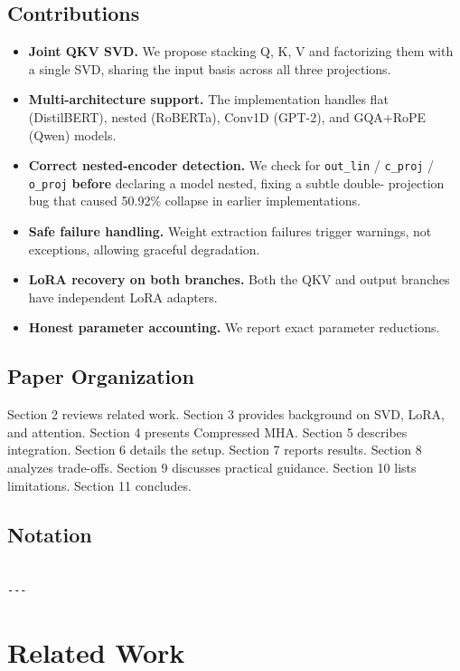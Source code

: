 \subsection{Contributions}

\begin{itemize}
\item \textbf{Joint QKV SVD.} We propose stacking Q, K, V and factorizing them with a
  single SVD, sharing the input basis across all three projections.
\item \textbf{Multi-architecture support.} The implementation handles flat (DistilBERT),
  nested (RoBERTa), Conv1D (GPT-2), and GQA+RoPE (Qwen) models.
\item \textbf{Correct nested-encoder detection.} We check for \texttt{out\_lin} / \texttt{c\_proj} /
  \texttt{o\_proj} \textbf{before} declaring a model nested, fixing a subtle double-
  projection bug that caused 50.92\% collapse in earlier implementations.
\item \textbf{Safe failure handling.} Weight extraction failures trigger warnings, not
  exceptions, allowing graceful degradation.
\item \textbf{LoRA recovery on both branches.} Both the QKV and output branches have
  independent LoRA adapters.
\item \textbf{Honest parameter accounting.} We report exact parameter reductions.

\end{itemize}
\subsection{Paper Organization}

Section 2 reviews related work. Section 3 provides background on SVD, LoRA, 
and attention. Section 4 presents Compressed MHA. Section 5 describes 
integration. Section 6 details the setup. Section 7 reports results. Section 8 
analyzes trade-offs. Section 9 discusses practical guidance. Section 10 lists 
limitations. Section 11 concludes.



\subsection{Notation}

\begin{lstlisting}

---
\end{lstlisting}

\section{Related Work}

